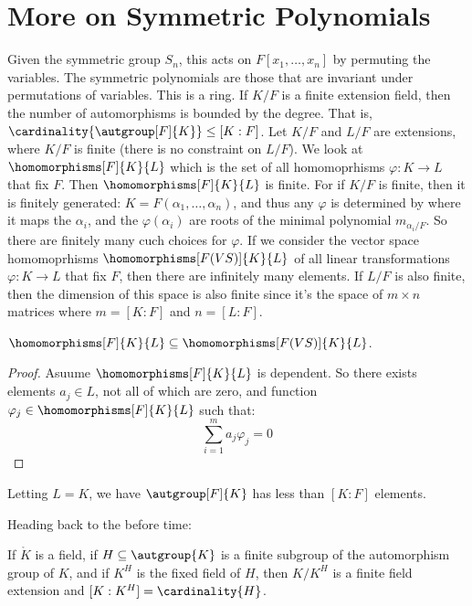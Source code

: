 \section{More on Symmetric Polynomials}
    Given the symmetric group $S_{n}$, this acts on $F[x_{1},\dots,x_{n}]$
    by permuting the variables. The symmetric polynomials are those that are
    invariant under permutations of variables. This is a ring.
    If $K/F$ is a finite extension field, then the number of automorphisms
    is bounded by the degree. That is,
    $\cardinality{\autgroup[F]{K}}\leq[K:F]$. Let $K/F$ and $L/F$ are
    extensions, where $K/F$ is finite (there is no constraint on $L/F$). We
    look at $\homomorphisms[F]{K}{L}$ which is the set of all homomoprhisms
    $\varphi:K\rightarrow{L}$ that fix $F$. Then $\homomorphisms[F]{K}{L}$
    is finite. For if $K/F$ is finite, then it is finitely generated:
    $K=F(\alpha_{1},\dots,\alpha_{n})$, and thus any $\varphi$ is determined
    by where it maps the $\alpha_{i}$, and the $\varphi(\alpha_{i})$ are
    roots of the minimal polynomial $m_{\alpha_{i}/F}$. So there are
    finitely many cuch choices for $\varphi$. If we consider the vector
    space homomoprhisms $\homomorphisms[F(VS)]{K}{L}$ of all linear
    transformations $\varphi:K\rightarrow{L}$ that fix $F$, then there are
    infinitely many elements. If $L/F$ is also finite, then the dimension
    of this space is also finite since it's the space of $m\times{n}$
    matrices where $m=[K:F]$ and $n=[L:F]$.
    \begin{theorem}
        $\homomorphisms[F]{K}{L}\subseteq\homomorphisms[F(VS)]{K}{L}$.
    \end{theorem}
    \begin{proof}
        Asuume $\homomorphisms[F]{K}{L}$ is dependent. So there exists
        elements $a_{j}\in{L}$, not all of which are zero, and function
        $\varphi_{j}\in\homomorphisms[F]{K}{L}$ such that:
        \begin{equation}
            \sum_{i=1}^{m}a_{j}\varphi_{j}=0
        \end{equation}
    \end{proof}
    \begin{theorem}
        Letting $L=K$, we have $\autgroup[F]{K}$ has less than $[K:F]$
        elements.
    \end{theorem}
    Heading back to the before time:
    \begin{theorem}
        If $\ring{K}$ is a field, if $H\subseteq\autgroup{K}$ is a finite
        subgroup of the automorphism group of $K$, and if $K^{H}$ is the
        fixed field of $H$, then $K/K^{H}$ is a finite field extension and
        $[K:K^{H}]=\cardinality{H}$.
    \end{theorem}
